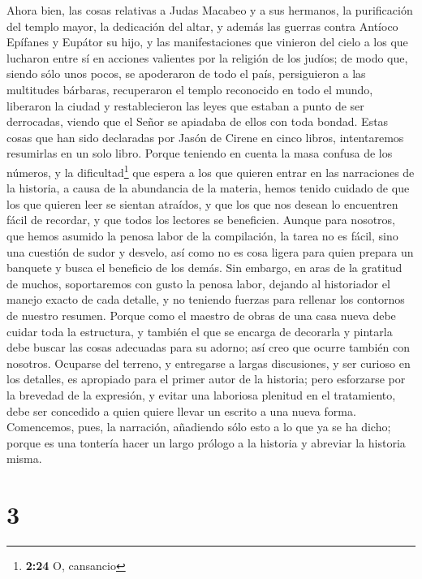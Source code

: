  Ahora bien, las cosas relativas a Judas Macabeo y a sus
hermanos, la purificación del templo mayor, la dedicación del altar,
 y además las guerras contra Antíoco Epífanes y Eupátor
su hijo,  y las manifestaciones que vinieron del cielo a
los que lucharon entre sí en acciones valientes por la religión de los
judíos; de modo que, siendo sólo unos pocos, se apoderaron de todo el
país, persiguieron a las multitudes bárbaras, 
recuperaron el templo reconocido en todo el mundo, liberaron la ciudad y
restablecieron las leyes que estaban a punto de ser derrocadas, viendo
que el Señor se apiadaba de ellos con toda bondad.  Estas
cosas que han sido declaradas por Jasón de Cirene en cinco libros,
intentaremos resumirlas en un solo libro.  Porque
teniendo en cuenta la masa confusa de los números, y la
dificultad\footnote{\textbf{2:24} O, cansancio} que espera a los que
quieren entrar en las narraciones de la historia, a causa de la
abundancia de la materia,  hemos tenido cuidado de que
los que quieren leer se sientan atraídos, y que los que nos desean lo
encuentren fácil de recordar, y que todos los lectores se beneficien.
 Aunque para nosotros, que hemos asumido la penosa labor
de la compilación, la tarea no es fácil, sino una cuestión de sudor y
desvelo,  así como no es cosa ligera para quien prepara
un banquete y busca el beneficio de los demás. Sin embargo, en aras de
la gratitud de muchos, soportaremos con gusto la penosa labor,
 dejando al historiador el manejo exacto de cada detalle,
y no teniendo fuerzas para rellenar los contornos de nuestro resumen.
 Porque como el maestro de obras de una casa nueva debe
cuidar toda la estructura, y también el que se encarga de decorarla y
pintarla debe buscar las cosas adecuadas para su adorno; así creo que
ocurre también con nosotros.  Ocuparse del terreno, y
entregarse a largas discusiones, y ser curioso en los detalles, es
apropiado para el primer autor de la historia;  pero
esforzarse por la brevedad de la expresión, y evitar una laboriosa
plenitud en el tratamiento, debe ser concedido a quien quiere llevar un
escrito a una nueva forma.  Comencemos, pues, la
narración, añadiendo sólo esto a lo que ya se ha dicho; porque es una
tontería hacer un largo prólogo a la historia y abreviar la historia
misma.

\hypertarget{section-2}{%
\section{3}\label{section-2}}

